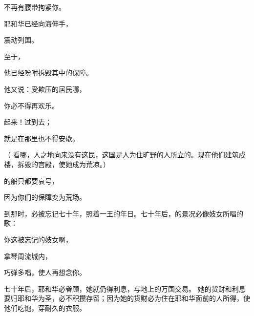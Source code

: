 {\par }{\Q 不再有腰带拘紧你。
\par }{\Q {}耶和华已经向海伸手，
\par }{\Q 震动列国。
\par }{\Q 至于{}，
\par }{\Q 他已经吩咐拆毁其中的保障。
\par }{\Q {}他又说：受欺压{}的居民哪，
\par }{\Q 你必不得再欢乐。
\par }{\Q 起来！过到{}去；
\par }{\Q 就是在那里也不得安歇。
\par }{\BB \par }{\PP （
看哪，{}人之地向来没有这民，这国是{}人为住旷野的人所立的。现在他们建筑戍楼，拆毁{}的宫殿，使她成为荒凉。）
\par }{\Q {}的船只都要哀号，
\par }{\Q 因为你们的保障变为荒场。
\par }{\MM {}到那时，{}必被忘记七十年，照着一王的年日。七十年后，{}的景况必像妓女所唱的歌：
\par }{\Q {}你这被忘记的妓女啊，
\par }{\Q 拿琴周流城内，
\par }{\Q 巧弹多唱，使人再想念你。
\par }{\PP {}七十年后，耶和华必眷顾{}，她就仍得利息，与地上的万国交易。
她的货财和利息要归耶和华为圣，必不积攒存留；因为她的货财必为住在耶和华面前的人所得，使他们吃饱，穿耐久的衣服。

}
